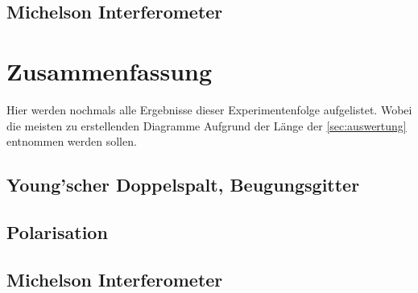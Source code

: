 \documentclass[12pt,english,ngerman]{scrartcl}
\begin{document}
\subsection{Michelson Interferometer}

\section{Zusammenfassung}\label{sec:zusammenfassung}

Hier werden nochmals alle Ergebnisse dieser Experimentenfolge aufgelistet.
Wobei die meisten zu erstellenden Diagramme Aufgrund der Länge der
\autoref{sec:auswertung} entnommen werden sollen.

\subsection{Young'scher Doppelspalt, Beugungsgitter}


\subsection{Polarisation}


\subsection{Michelson Interferometer}


\newpage
\printbibliography
\listoffigures
\listoftables
\end{document}
